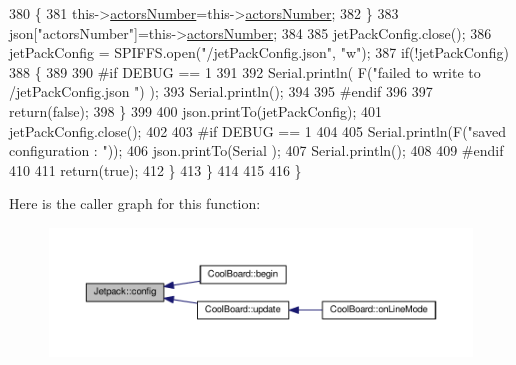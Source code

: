\begin{DoxyCode}
380             \{
381                 this->\hyperlink{classJetpack_a52c86319cb3f7f1ab744a64db18a7ba5}{actorsNumber}=this->\hyperlink{classJetpack_a52c86319cb3f7f1ab744a64db18a7ba5}{actorsNumber};
382             \}
383             json[\textcolor{stringliteral}{"actorsNumber"}]=this->\hyperlink{classJetpack_a52c86319cb3f7f1ab744a64db18a7ba5}{actorsNumber};
384 
385             jetPackConfig.close();          
386             jetPackConfig = SPIFFS.open(\textcolor{stringliteral}{"/jetPackConfig.json"}, \textcolor{stringliteral}{"w"});            
387             \textcolor{keywordflow}{if}(!jetPackConfig)
388             \{
389             
390 \textcolor{preprocessor}{            #if DEBUG == 1 }
391 
392                 Serial.println( F(\textcolor{stringliteral}{"failed to write to /jetPackConfig.json "}) );
393                 Serial.println();
394             
395 \textcolor{preprocessor}{            #endif}
396                 
397                 \textcolor{keywordflow}{return}(\textcolor{keyword}{false});          
398             \}  
399 
400             json.printTo(jetPackConfig);
401             jetPackConfig.close();
402 
403 \textcolor{preprocessor}{        #if DEBUG == 1 }
404             
405             Serial.println(F(\textcolor{stringliteral}{"saved configuration : "}));
406             json.printTo(Serial );
407             Serial.println();       
408         
409 \textcolor{preprocessor}{        #endif}
410 
411             \textcolor{keywordflow}{return}(\textcolor{keyword}{true}); 
412         \}
413     \}   
414     
415 
416 \}
\end{DoxyCode}
Here is the caller graph for this function\+:
\nopagebreak
\begin{figure}[H]
\begin{center}
\leavevmode
\includegraphics[width=350pt]{classJetpack_ab065ee83e244265a2223a22f3ee4a719_icgraph}
\end{center}
\end{figure}
\mbox{\label{classJetpack_a86d2e83436ef4b85f4c3a6e85ac785b0}} 
